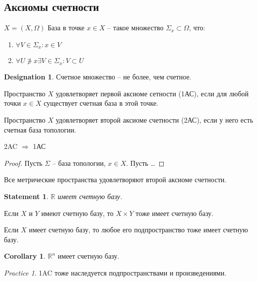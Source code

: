 \documentclass[11pt]{book}
\newcommand{\R}{\mathbb{R}}
\theoremstyle{definition}
\theoremstyle{plain}
\theoremstyle{plain}
\newtheorem*{st}{Statement}
\theoremstyle{definition}
\newtheorem*{cor}{Corollary}
\newtheorem*{name}{Designation}
\theoremstyle{remark}
\newtheorem*{prac}{Practice}
\begin{document}
\subsection{Аксиомы счетности}
\begin{defn}
    $ X = (X , \Omega )$
    База в точке $ x \in  X$ -- такое множество $ \Sigma _x \subset \Omega $, что:
    \begin{enumerate}
	\item $ \forall V \in  \Sigma _x: x \in  V$
	\item $ \forall U \not\ni x \exists V \in  \Sigma _x: V \subset U$
    \end{enumerate}
\end{defn}
\begin{name}
    Счетное множество -- не более, чем счетное.
\end{name}
\begin{defn}
    Пространство $ X$ удовлетворяет первой аксиоме сетности (1АС), если для любой точки $ x \in  X$ существует счетная база в этой точке.
\end{defn}
\begin{defn}
    Пространство $ X$ удовлетворяет второй аксиоме счетности (2АС), если у него есть счетная база топологии.
\end{defn}
\begin{thm}
    2AC  $ \Rightarrow $ 1АС
\end{thm}
\begin{proof}
    Пусть $  \Sigma  $ -- база топологии, $ x \in X$. Пусть \ldots
\end{proof}
\begin{thm}
    Все метрические пространства удовлетворяют второй аксиоме счетности.
\end{thm}
\begin{st}
    $ \R$ имеет счетную базу.
\end{st}
\begin{thm}
    Если $ X$ и $ Y$ имеют счетную базу, то $ X \times  Y$ тоже имеет счетную базу.
\end{thm}
\begin{thm}
    Если $ X$ имеет счетную базу, то любое его подпространство тоже имеет счетную базу.
\end{thm}
\begin{cor}
    $ \R^{n}$ имеет счетную базу.
\end{cor}
\begin{prac}
    1AC тоже наследуется подпространствами и произведениями.
\end{prac}
\end{document}

